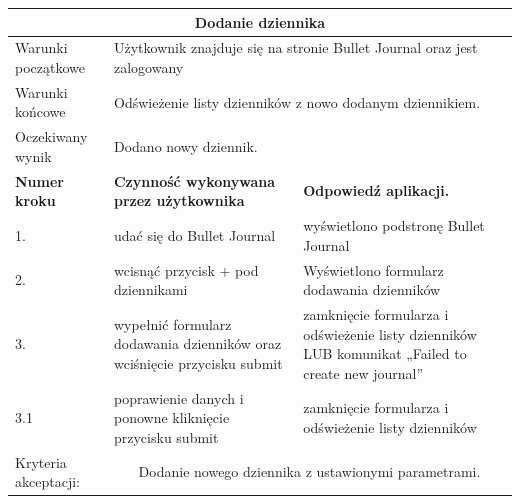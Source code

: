 \documentclass[a4paper,11pt]{report}
\begin{document}
\begin{table}[H]
	\centering
	\begin{tabular}{|p{2cm}|p{6cm}|p{6cm}|}
	\hline
	\multicolumn{3}{|c|}{\textbf{Dodanie dziennika}}\\
	\hline
	Warunki początkowe & \multicolumn{2}{|p{12cm}|}{Użytkownik znajduje się na stronie Bullet Journal oraz jest zalogowany}\\
	\hline
	Warunki końcowe & \multicolumn{2}{|p{12cm}|}{Odświeżenie listy dzienników z nowo dodanym dziennikiem.}\\
	\hline
	Oczekiwany wynik & \multicolumn{2}{|p{12cm}|}{Dodano nowy dziennik.}\\
	\hline
	\textbf{Numer kroku} & \textbf{Czynność wykonywana przez użytkownika} & \textbf{Odpowiedź aplikacji.} \\
	\hline
	1. & udać się do Bullet Journal & wyświetlono podstronę Bullet Journal \\
	\hline
	2. & wcisnąć przycisk + pod dziennikami & Wyświetlono formularz dodawania dzienników \\
	\hline
	3. & wypełnić formularz dodawania dzienników oraz wciśnięcie przycisku submit & zamknięcie formularza i odświeżenie listy dzienników LUB komunikat „Failed to create new journal” \\
	\hline
	3.1 & poprawienie danych i ponowne kliknięcie przycisku submit & zamknięcie formularza i odświeżenie listy dzienników \\
	\hline
	Kryteria akceptacji: & \multicolumn{2}{|c|}{Dodanie nowego dziennika z ustawionymi parametrami.} \\
	\hline
	\end{tabular}
\end{table}
\end{document}
